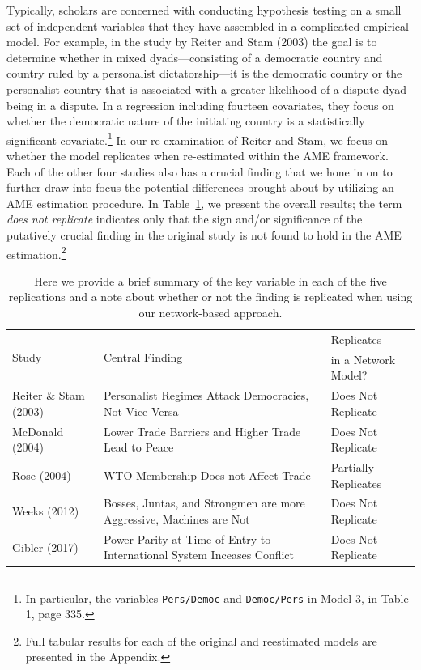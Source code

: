 Typically, scholars are concerned with conducting hypothesis testing on a small set of independent variables that they have assembled in a complicated empirical model. For example, in the study by Reiter and Stam (2003) the goal is to determine whether in mixed dyads---consisting of a democratic country and country ruled by a personalist dictatorship---it is the democratic country or the personalist country that is associated with a greater likelihood of a dispute dyad being in a dispute.  In a regression including fourteen covariates, they focus on whether the democratic nature of the initiating country is a statistically significant covariate.\footnote{In particular, the variables \texttt{Pers/Democ} and \texttt{Democ/Pers} in Model 3, in Table 1, page 335.} In our re-examination of Reiter and Stam, we focus on whether the model replicates when re-estimated within the AME framework. Each of the other four studies also has a crucial finding that we hone in on to further draw into focus the potential differences brought about by utilizing an AME estimation procedure.  In Table~\ref{tab:modelFindingSumm}, we present the overall results; the term \textit{does not replicate} indicates only that the sign and/or significance of the putatively crucial finding in the original study is not found to hold in the AME estimation.\footnote{Full tabular results for each of the original and reestimated models are presented in the Appendix.}

\begin{table}[ht]
\centering
\caption{Here we provide a brief summary of the key variable in each of the five replications and a note about whether or not the finding is replicated when using our network-based approach.}
	\begin{tabular}{l p{7cm} l} \toprule
		\multirow{2}{*}{Study} & \multirow{2}{*}{Central Finding} &  Replicates \\ 
			& &  in a Network Model? \\ \toprule
		Reiter \& Stam (2003) & Personalist Regimes Attack Democracies, Not Vice Versa & {Does Not Replicate} \\ \midrule
		McDonald (2004) & Lower Trade Barriers and Higher Trade Lead to Peace & {Does Not Replicate}\\ \midrule
		Rose (2004) & WTO Membership Does not Affect Trade & {Partially Replicates}\\ \midrule
		Weeks (2012) & Bosses, Juntas, and Strongmen are more Aggressive, Machines are Not & {Does Not Replicate} \\\midrule
		Gibler (2017) & Power Parity at Time of Entry to International System Inceases Conflict & {Does Not Replicate}\\ \bottomrule
	\end{tabular}
	\label{tab:modelFindingSumm}
\end{table}

